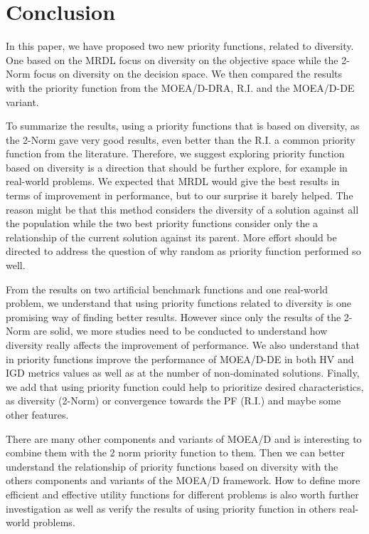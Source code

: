 \section{Conclusion}

In this paper, we have proposed two new priority functions, related to diversity. One based on the MRDL focus on diversity on the objective space while the 2-Norm focus on diversity on the decision space. We then compared the results with the priority function from the MOEA/D-DRA, R.I. and the MOEA/D-DE variant. 

To summarize the results, using a priority functions that is based on diversity, as the 2-Norm gave very good results, even better than the R.I. a common priority function from the literature. Therefore, we suggest exploring priority function based on diversity is a direction that should be further explore, for example in real-world problems. We expected that MRDL would give the best results in terms of improvement in performance, but to our surprise it barely helped. The reason might be that this method considers the diversity of a solution against all the population while the two best priority functions consider only the a relationship of the current solution against its parent. More effort should be directed to address the question of why random as priority function performed so well.

From the results on two artificial benchmark functions and one real-world problem, we understand that using priority functions related to diversity is one promising way of finding better results. However since only the results of the 2-Norm are solid, we more studies need to be conducted to understand how diversity really affects the improvement of performance. We also understand that in priority functions improve the performance of MOEA/D-DE in both HV and IGD metrics values as well as at the number of non-dominated solutions. Finally, we add that using priority function could help to prioritize desired characteristics, as diversity (2-Norm) or convergence towards the PF (R.I.) and maybe some other features.

There are many other components and variants of MOEA/D and is interesting to combine them with the 2 norm priority function to them. Then we can better understand the relationship of priority functions based on diversity with the others components and variants of the MOEA/D framework. How to define more efficient and effective utility functions for different problems is also worth further investigation as well as verify the results of using priority function in others real-world problems.


